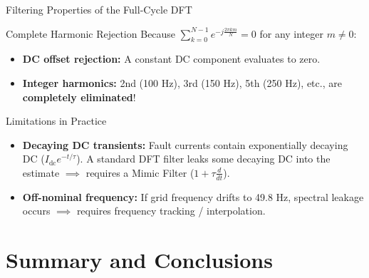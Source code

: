 \begin{frame}[allowframebreaks]{Filtering Properties of the Full-Cycle DFT}
    \begin{block}{Complete Harmonic Rejection}
        Because $\sum_{k=0}^{N-1} e^{-j \frac{2\pi k m}{N}} = 0$ for any integer $m \neq 0$:
        \begin{itemize}
            \item \textbf{DC offset rejection:} A constant DC component evaluates to zero.
            \item \textbf{Integer harmonics:} 2nd (100 Hz), 3rd (150 Hz), 5th (250 Hz), etc., are \alert{\textbf{completely eliminated}}!
        \end{itemize}
    \end{block}

    \begin{alertblock}{Limitations in Practice}
        \begin{itemize}
            \item \textbf{Decaying DC transients:} Fault currents contain exponentially decaying DC ($I_{\text{dc}} e^{-t/\tau}$). A standard DFT filter leaks some decaying DC into the estimate $\implies$ requires a Mimic Filter ($1 + \tau \frac{d}{dt}$).
            \item \textbf{Off-nominal frequency:} If grid frequency drifts to 49.8 Hz, spectral leakage occurs $\implies$ requires frequency tracking / interpolation.
        \end{itemize}
    \end{alertblock}
\end{frame}


\section{Summary and Conclusions}

